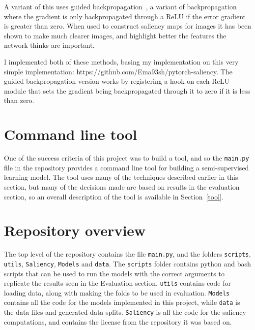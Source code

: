 A variant of this uses guided backpropagation~\cite{DBLP:journals/corr/SpringenbergDBR14}, a variant of backpropagation where the 
gradient is only backpropagated through a ReLU if the error gradient is greater than zero. When used to construct saliency maps for 
images it has been shown to make much clearer images, and highlight better the features the network thinks are important.

I implemented both of these methods, basing my implementation on this very simple implementation: https://github.com/Ema93sh/pytorch-saliency.
The guided backpropagation version works by registering a hook on each ReLU module that sets the gradient being backpropagated through it 
to zero if it is less than zero.

\section{Command line tool}
One of the success criteria of this project was to build a tool, and so the \texttt{main.py} file in the repository provides a command line tool 
for building a semi-supervised learning model. The tool uses many of the techniques described earlier in this section, but many of the 
decisions made are based on results in the evaluation section, so an overall description of the tool is available in Section~\ref{tool}.

\section{Repository overview}

The top level of the repository contains the file \texttt{main.py}, and the folders \texttt{scripts}, \texttt{utils}, \texttt{Saliency},
\texttt{Models} and \texttt{data}. The \texttt{scripts} folder contains python and bash scripts that can be used to run the models with the correct 
arguments to replicate the results seen in the Evaluation section. \texttt{utils} contains code for loading data, along with making the 
folds to be used in evaluation.  \texttt{Models} contains all the code for the models implemented in this project, while \texttt{data} 
is the data files and generated data splits. \texttt{Saliency} is all the code for the saliency computations, and contains the license 
from the repository it was based on.